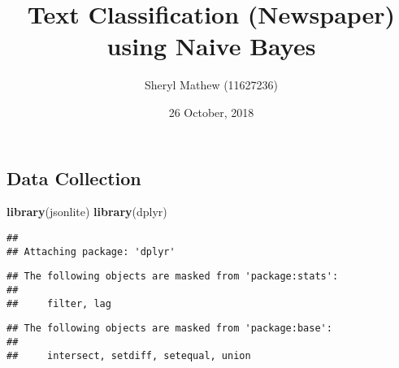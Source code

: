 \documentclass[]{article}
\title{Text Classification (Newspaper) using Naive Bayes}
\author{Sheryl Mathew (11627236)}
\date{26 October, 2018}
\newenvironment{Shaded}{\begin{snugshade}}{\end{snugshade}}
\newcommand{\KeywordTok}[1]{\textcolor[rgb]{0.13,0.29,0.53}{\textbf{#1}}}
\newcommand{\NormalTok}[1]{#1}
\begin{document}
\maketitle

\subsection{Data Collection}\label{data-collection}

\begin{Shaded}
\begin{Highlighting}[]
\KeywordTok{library}\NormalTok{(jsonlite)}
\KeywordTok{library}\NormalTok{(dplyr)}
\end{Highlighting}
\end{Shaded}

\begin{verbatim}
## 
## Attaching package: 'dplyr'
\end{verbatim}

\begin{verbatim}
## The following objects are masked from 'package:stats':
## 
##     filter, lag
\end{verbatim}

\begin{verbatim}
## The following objects are masked from 'package:base':
## 
##     intersect, setdiff, setequal, union
\end{verbatim}
\end{document}
